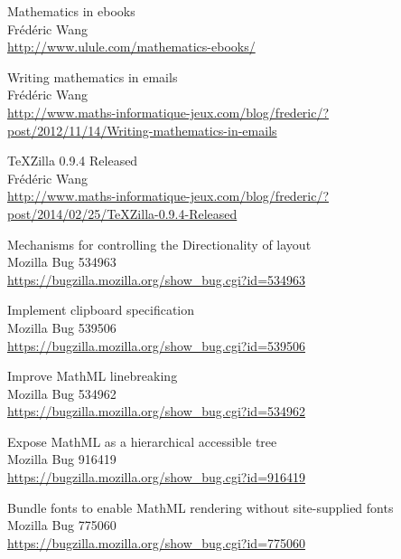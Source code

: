 \begin{thebibliography}{7}
Mathematics in ebooks \\
Frédéric Wang \\
\href{http://www.ulule.com/mathematics-ebooks/}{http://www.ulule.com/mathematics-ebooks/}

Writing mathematics in emails \\
Frédéric Wang \\
\href{http://www.maths-informatique-jeux.com/blog/frederic/?post/2012/11/14/Writing-mathematics-in-emails}{http://www.maths-informatique-jeux.com/blog/frederic/?post/2012/11/14/Writing-mathematics-in-emails}

TeXZilla 0.9.4 Released \\
Frédéric Wang \\
\href{http://www.maths-informatique-jeux.com/blog/frederic/?post/2014/02/25/TeXZilla-0.9.4-Released}{http://www.maths-informatique-jeux.com/blog/frederic/?post/2014/02/25/TeXZilla-0.9.4-Released}

Mechanisms for controlling the Directionality of layout \\
Mozilla Bug 534963 \\
\href{https://bugzilla.mozilla.org/show_bug.cgi?id=534963}{https://bugzilla.mozilla.org/show\_bug.cgi?id=534963}

Implement clipboard specification \\
Mozilla Bug 539506 \\
\href{https://bugzilla.mozilla.org/show_bug.cgi?id=539506}{https://bugzilla.mozilla.org/show\_bug.cgi?id=539506}

Improve MathML linebreaking  \\
Mozilla Bug 534962 \\
\href{https://bugzilla.mozilla.org/show_bug.cgi?id=534962}{https://bugzilla.mozilla.org/show\_bug.cgi?id=534962}

Expose MathML as a hierarchical accessible tree \\
Mozilla Bug 916419 \\
\href{https://bugzilla.mozilla.org/show_bug.cgi?id=916419}{https://bugzilla.mozilla.org/show\_bug.cgi?id=916419}

 Bundle fonts to enable MathML rendering without site-supplied fonts \\
Mozilla Bug 775060 \\
\href{https://bugzilla.mozilla.org/show_bug.cgi?id=775060}{https://bugzilla.mozilla.org/show\_bug.cgi?id=775060}


\end{thebibliography}
